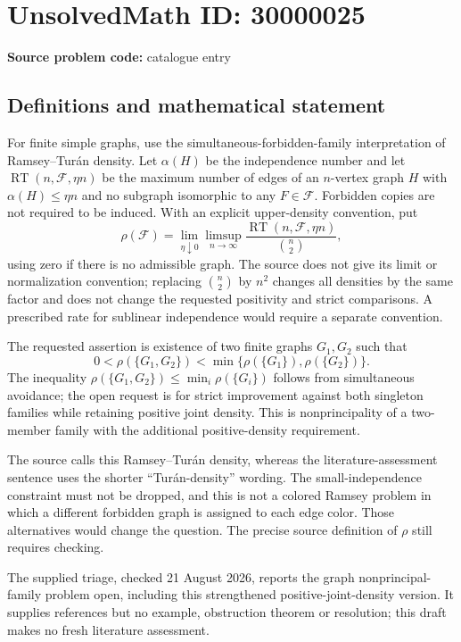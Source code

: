 \documentclass[11pt]{article}
\begin{document}
\section*{UnsolvedMath ID: 30000025}
\textbf{Source problem code:} catalogue entry
\subsection{Definitions and mathematical statement}
For finite simple graphs, use the simultaneous-forbidden-family interpretation of Ramsey--Tur\'an density. Let $\alpha(H)$ be the independence number and let $\operatorname{RT}(n,\mathcal F,\eta n)$ be the maximum number of edges of an $n$-vertex graph $H$ with $\alpha(H)\leq\eta n$ and no subgraph isomorphic to any $F\in\mathcal F$. Forbidden copies are not required to be induced. With an explicit upper-density convention, put
\[
 \rho(\mathcal F)=\lim_{\eta\downarrow0}\limsup_{n\to\infty}
 \frac{\operatorname{RT}(n,\mathcal F,\eta n)}{\binom n2},
\]
using zero if there is no admissible graph. The source does not give its limit or normalization convention; replacing $\binom n2$ by $n^2$ changes all densities by the same factor and does not change the requested positivity and strict comparisons. A prescribed rate for sublinear independence would require a separate convention.

The requested assertion is existence of two finite graphs $G_1,G_2$ such that
\[
 0<\rho(\{G_1,G_2\})
 <\min\{\rho(\{G_1\}),\rho(\{G_2\})\}.
\]
The inequality $\rho(\{G_1,G_2\})\leq\min_i\rho(\{G_i\})$ follows from simultaneous avoidance; the open request is for strict improvement against both singleton families while retaining positive joint density. This is nonprincipality of a two-member family with the additional positive-density requirement.

The source calls this Ramsey--Tur\'an density, whereas the literature-assessment sentence uses the shorter ``Tur\'an-density'' wording. The small-independence constraint must not be dropped, and this is not a colored Ramsey problem in which a different forbidden graph is assigned to each edge color. Those alternatives would change the question. The precise source definition of $\rho$ still requires checking.

The supplied triage, checked 21 August 2026, reports the graph nonprincipal-family problem open, including this strengthened positive-joint-density version. It supplies references but no example, obstruction theorem or resolution; this draft makes no fresh literature assessment.
\end{document}
